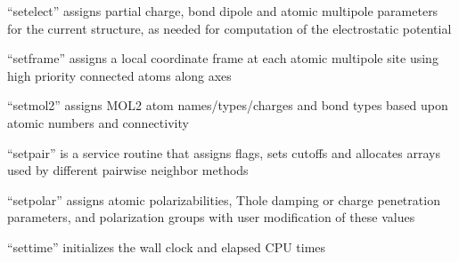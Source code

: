 \documentclass[letterpaper,11pt,english]{sphinxmanual}
\begin{document}

“setelect” assigns partial charge, bond dipole and atomic
multipole parameters for the current structure, as needed
for computation of the electrostatic potential





“setframe” assigns a local coordinate frame at each atomic
multipole site using high priority connected atoms along axes







“setmol2” assigns MOL2 atom names/types/charges and bond types
based upon atomic numbers and connectivity



“setpair” is a service routine that assigns flags, sets cutoffs
and allocates arrays used by different pairwise neighbor methods


“setpolar” assigns atomic polarizabilities, Thole damping or
charge penetration parameters, and polarization groups with
user modification of these values




“settime” initializes the wall clock and elapsed CPU times



\end{document}
